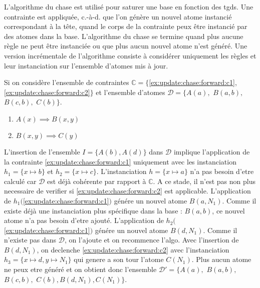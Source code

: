 L'algorithme du \gls{chase} \cite{} est utilisé pour saturer une base en fonction des \glspl{tgd}.
Une contrainte est appliquée, c.-à-d. que l'on génère un nouvel atome instancié correspondant à la tête, quand le corps de la contrainte peux être instancié par des atomes dans la base.
L'algorithme du \gls{chase} se termine quand plus aucune règle ne peut être instanciée ou que plus aucun nouvel atome n'est généré.
Une version incrémentale de l'algorithme consiste à considérer uniquement les règles et leur instanciation sur l'ensemble d'atomes mis à jour.

\begin{example}
    \label{ex:update:chase:forward}
    Si on considère l'ensemble de contraintes $\mathbb{C} = \{$\ref{ex:update:chase:forward:c1}, \ref{ex:update:chase:forward:c2}$\}$ et l'ensemble d'atomes $\mathcal{D} = \{A(a),$ $B(a, b),$ $B(c, b),$ $C(b)\}$.
    \begin{enumerate}[label=\textbf{$c_\arabic*$ :},ref=$c_\arabic*$]
        \item $A(x) \implies B(x, y)$ \label{ex:update:chase:forward:c1}
        \item $B(x, y) \implies C(y)$ \label{ex:update:chase:forward:c2}
    \end{enumerate}

    L'insertion de l'ensemble $I = \{A(b), A(d)\}$ dans $\mathcal{D}$ implique l'application de la contrainte \ref{ex:update:chase:forward:c1} uniquement avec les instanciation $h_1 = \{x \mapsto b\}$ et $h_2 = \{x \mapsto c\}$.
    L'instanciation $h = \{x \mapsto a\}$ n'a pas besoin d'etre calculé car $\mathcal{D}$ est déjà cohérente par rapport à $\mathbb{C}$.
    A ce stade, il n'est pas non plus necessaire de verifier si \ref{ex:update:chase:forward:c2} est applicable.
    L'application de $h_1($\ref{ex:update:chase:forward:c1}$)$ génére un nouvel atome $B(a, N_1)$.
    Comme il existe déjà une instanciation plus spécifique dans la base : $B(a, b)$, ce nouvel atome n'a pas besoin d'etre ajouté.
    L'application de $h_2($\ref{ex:update:chase:forward:c1}$)$ génére un nouvel atome $B(d, N_1)$.
    Comme il n'existe pas dans $\mathcal{D}$, on l'ajoute et on recommence l'algo.
    Avec l'insertion de $B(d, N_1)$, on declenche \ref{ex:update:chase:forward:c2} avec l'instanciation $h_3 = \{x \mapsto d, y \mapsto N_1\}$ qui genere a son tour l'atome $C(N_1)$.
    Plus aucun atome ne peux etre généré et on obtient donc l'ensemble $\mathcal{D}' = \{A(a),$ $B(a, b),$ $B(c, b),$ $C(b), B(d, N_1), C(N_1)\}$.
\end{example}

